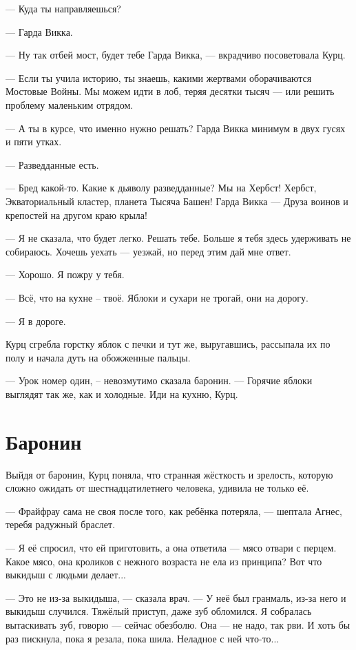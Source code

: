 --- Куда ты направляешься?

--- Гарда Викка.

--- Ну так отбей мост, будет тебе Гарда Викка, --- вкрадчиво посоветовала Курц.

--- Если ты учила историю, ты знаешь, какими жертвами оборачиваются Мостовые Войны.
Мы можем идти в лоб, теряя десятки тысяч --- или решить проблему маленьким отрядом.

--- А ты в курсе, что именно нужно решать?
Гарда Викка минимум в двух гусях и пяти утках.

--- Разведданные есть.

--- Бред какой-то.
Какие к дьяволу разведданные?
Мы на Хербст!
Хербст, Экваториальный кластер, планета Тысяча Башен!
Гарда Викка --- Друза воинов и крепостей на другом краю крыла!

--- Я не сказала, что будет легко.
Решать тебе.
Больше я тебя здесь удерживать не собираюсь.
Хочешь уехать --- уезжай, но перед этим дай мне ответ.

--- Хорошо.
Я пожру у тебя.

--- Всё, что на кухне -- твоё.
Яблоки и сухари не трогай, они на дорогу.

--- Я в дороге.

Курц сгребла горстку яблок с печки и тут же, выругавшись, рассыпала их по полу и начала дуть на обожженные пальцы.

--- Урок номер один, -- невозмутимо сказала баронин.
--- Горячие яблоки выглядят так же, как и холодные.
Иди на кухню, Курц.

\section{Баронин}

Выйдя от баронин, Курц поняла, что странная жёсткость и зрелость, которую сложно ожидать от шестнадцатилетнего человека, удивила не только её.

--- Фрайфрау сама не своя после того, как ребёнка потеряла, --- шептала Агнес, теребя радужный браслет.

--- Я её спросил, что ей приготовить, а она ответила --- мясо отвари с перцем.
Какое мясо, она кроликов с нежного возраста не ела из принципа?
Вот что выкидыш с людьми делает...

--- Это не из-за выкидыша, --- сказала врач.
--- У неё был гранмаль, из-за него и выкидыш случился.
Тяжёлый приступ, даже зуб обломился.
Я собралась вытаскивать зуб, говорю --- сейчас обезболю.
Она --- не надо, так рви.
И хоть бы раз пискнула, пока я резала, пока шила.
Неладное с ней что-то...

